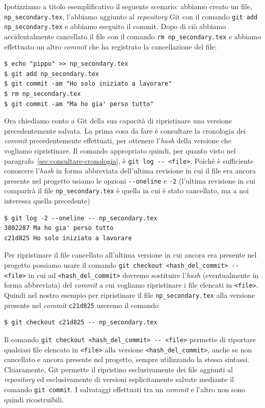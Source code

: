 \documentclass[a4paper,12pt,oneside]{article}
\begin{document}
Ipotizziamo a titolo esemplificativo il seguente scenario: abbiamo creato un
file, \lstinline|np_secondary.tex|, l'abbiamo aggiunto al \emph{repository} Git
con il comando \lstinline|git add np_secondary.tex| e abbiamo eseguito il
commit. Dopo di ciò abbiamo accidentalmente cancellato il file con il comando
\lstinline|rm np_secondary.tex| e abbiamo effettuato un altro \emph{commit}
che ha registrato la cancellazione del file:
\begin{lstlisting}
$ echo "pippo" >> np_secondary.tex
$ git add np_secondary.tex
$ git commit -am "Ho solo iniziato a lavorare"
$ rm np_secondary.tex
$ git commit -am "Ma ho gia' perso tutto"
\end{lstlisting}
Ora chiediamo conto a Git della sua capacità di ripristinare una versione
precedentemente salvata. La prima cosa da fare è consultare la cronologia dei
\emph{commit} precedentemente effettuati, per ottenere l'\emph{hash} della
versione che vogliamo ripristinare. Il comando appropriato quindi, per quanto
visto nel paragrafo~\ref{sec:consultare-cronologia}, è
\lstinline|git log -- <file>|. Poiché è sufficiente conoscere l'\emph{hash} in
forma abbreviata dell'ultima revisione in cui il file era ancora presente nel
progetto usiamo le opzioni \lstinline|--oneline| e \lstinline|-2| (l'ultima
revisione in cui comparirà il file \lstinline|np_secondary.tex| è quella in cui
è stato cancellato, ma a noi interessa quella precedente)
\begin{lstlisting}
$ git log -2 --oneline -- np_secondary.tex
3802287 Ma ho gia' perso tutto
c21d825 Ho solo iniziato a lavorare
\end{lstlisting}
Per ripristinare il file cancellato all'ultima versione in cui ancora era
presente nel progetto possiamo usare il comando
\lstinline|git checkout <hash_del_commit> -- <file>| in cui ad
\lstinline|<hash_del_commit>| dovremo sostituire l'\emph{hash} (eventualmente in
forma abbreviata) del \emph{commit} a cui vogliamo ripristinare i file elencati
in \lstinline|<file>|. Quindi nel nostro esempio per ripristinare il file
\lstinline|np_secondary.tex| alla versione presente nel \emph{commit}
\lstinline|c21d825| useremo il comando
\begin{lstlisting}
$ git checkout c21d825 -- np_secondary.tex
\end{lstlisting}

Il comando \lstinline|git checkout <hash_del_commit> -- <file>| permette di
riportare qualsiasi file elencato in \lstinline|<file>| alla versione
\lstinline|<hash_del_commit>|, anche se non cancellato e ancora presente nel
progetto, sempre utilizzando la stessa sintassi. Chiaramente, Git permette il
ripristino esclusivamente dei file aggiunti al \emph{repository} ed
esclusivamente di versioni esplicitamente salvate mediante il comando
\lstinline|git commit|. I salvataggi effettuati tra un \emph{commit} e l'altro
non sono quindi ricostruibili.
\end{document}
